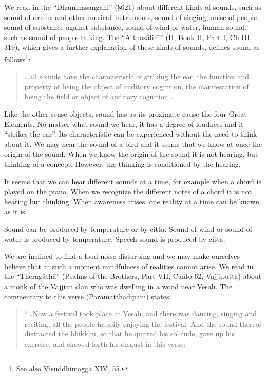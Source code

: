 \documentclass{book}
\begin{document}
We read in the ``Dhamma\-sanga\d ni'' ({\S}621) about different kinds of
sounds, such as sound of drums and other musical instruments, sound of
singing, noise of people, sound of  substance against substance,
sound of wind or water, human sound, such as sound of people talking.
The ``Atthas{\=a}lin\=\i'' (II, Book II, Part I, Ch III, 319), which
gives a further explanation of these kinds of sounds, defines sound as
follows\footnote{See also Visuddhimagga XIV, 55.}: 




\begin{quote}\begin{flushleft}
\ldots all sounds have the characteristic of striking the ear, the function and property of being the object of auditory cognition, the manifestation of being the field or object of auditory cognition\ldots
\end{flushleft}\end{quote}




Like the other sense objects, sound has as its proximate cause the four
Great Elements. No matter what sound we hear, it has a degree of
loudness and it ``strikes the ear''. Its characteristic can be
experienced without the need to think about it. We may hear the sound
of a bird and it seems that we know at once the origin of the sound.
When we know the origin of the sound it is not hearing, but thinking of
a concept. However, the thinking is conditioned by the hearing. 

It seems that we can hear different sounds at a time, for example when a
chord is played on the piano. When we recognize the different notes
of a chord it is not hearing but thinking. When awareness arises, one
reality at a time can be known as it is. 

Sound can be produced by temperature or by citta. Sound of wind or sound
of water is produced by temperature. Speech sound is produced by citta.


We are inclined to find a loud noise disturbing and we may make
ourselves believe that at such a moment mindfulness of realities cannot
arise. We read in the ``Therag{\=a}th{\=a}'' (Psalms of the Brothers,
Part VII, Canto 62, Vajjiputta) about a monk of the Vajjian clan who
was dwelling in a wood near Ves{\=a}l\=\i. The commentary to this verse
(Paramatthad\=\i pan\=\i) states:




\begin{quote}\begin{flushleft}
``\ldots Now a festival took place at Ves{\=a}l\=\i, and there was dancing, singing and reciting, all the people happily enjoying the festival. And
the sound thereof distracted the bhikkhu, so that he quitted his
solitude, gave up his exercise, and showed forth his disgust in this
verse:
\end{flushleft}\end{quote}
\end{document}
